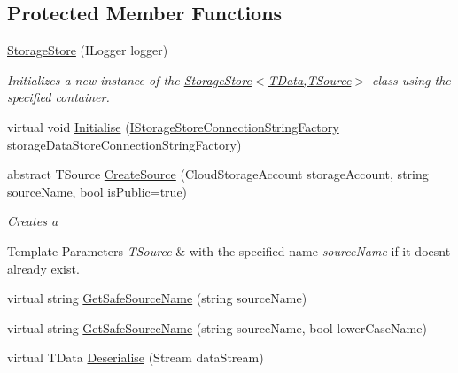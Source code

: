 \subsection*{Protected Member Functions}
\begin{DoxyCompactItemize}
\item 
\hyperlink{classCqrs_1_1Azure_1_1BlobStorage_1_1StorageStore_ae7a725cdcb7de73e097b02c19463bae7}{Storage\+Store} (I\+Logger logger)
\begin{DoxyCompactList}\small\item\em Initializes a new instance of the \hyperlink{classCqrs_1_1Azure_1_1BlobStorage_1_1StorageStore_ae7a725cdcb7de73e097b02c19463bae7}{Storage\+Store$<$\+T\+Data,\+T\+Source$>$} class using the specified container. \end{DoxyCompactList}\item 
virtual void \hyperlink{classCqrs_1_1Azure_1_1BlobStorage_1_1StorageStore_a8d16603267a768190f2c49ca3d1c439e}{Initialise} (\hyperlink{interfaceCqrs_1_1Azure_1_1BlobStorage_1_1IStorageStoreConnectionStringFactory}{I\+Storage\+Store\+Connection\+String\+Factory} storage\+Data\+Store\+Connection\+String\+Factory)
\item 
abstract T\+Source \hyperlink{classCqrs_1_1Azure_1_1BlobStorage_1_1StorageStore_a07903b6c3eca8d49878deb6e2e5719e0}{Create\+Source} (Cloud\+Storage\+Account storage\+Account, string source\+Name, bool is\+Public=true)
\begin{DoxyCompactList}\small\item\em Creates a 
\begin{DoxyTemplParams}{Template Parameters}
{\em T\+Source} & with the specified name {\itshape source\+Name}  if it doesn\textquotesingle{}t already exist. \\
\hline
\end{DoxyTemplParams}
\end{DoxyCompactList}\item 
virtual string \hyperlink{classCqrs_1_1Azure_1_1BlobStorage_1_1StorageStore_a3ed119d808d9b29e99b1c6c983831482}{Get\+Safe\+Source\+Name} (string source\+Name)
\item 
virtual string \hyperlink{classCqrs_1_1Azure_1_1BlobStorage_1_1StorageStore_ad3364a0c84d5ed666615b9528d6f640e}{Get\+Safe\+Source\+Name} (string source\+Name, bool lower\+Case\+Name)
\item 
virtual T\+Data \hyperlink{classCqrs_1_1Azure_1_1BlobStorage_1_1StorageStore_a211bc47bff1108d10e319fee8b9769a0}{Deserialise} (Stream data\+Stream)
\item 

\end{DoxyCompactItemize}
